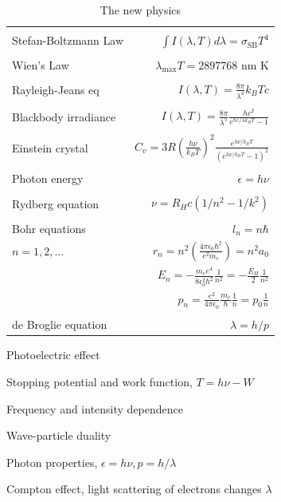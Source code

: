 \documentclass[11pt]{article}
\begin{document}
\begin{outline}
\begin{outline}
\begin{table} 
\begin{center}
    \caption{The new physics}
    \begin{tabular}{|lr|}
     \hline
 & \\
Stefan-Boltzmann Law & $\displaystyle  \int I(\lambda,T)d\lambda = \sigma_\mathrm{SB} T^4$
\\ & \\
Wien's Law & $\displaystyle \lambda_\mathrm{max}T=2897768$ nm K \\
 & \\
Rayleigh-Jeans eq& $\displaystyle I(\lambda,T) = \frac{8\pi}{\lambda^4} k_B T c $ \\ 
& \\
Blackbody irradiance & $\displaystyle I(\lambda, T) =
\frac{8\pi}{\lambda^5}\frac{hc^2}{e^{hc/\lambda k_B T}-1}$ \\ 
& \\
Einstein crystal & $\displaystyle C_v=3R \left(\frac{h\nu}{k_BT}\right )^2\frac{e^{h\nu/k_BT}}{\left
            ( e^{h\nu/k_BT}-1 \right )^2}$ \\
& \\
Photon energy & $\displaystyle \epsilon=h\nu $ \\
& \\
Rydberg equation & $\displaystyle \nu = R_H c\left (1/n^2
        -1/k^2 \right)$ \\
& \\
Bohr equations & $\displaystyle l_n=n \hbar$ \\
$\displaystyle n=1,2, \ldots $ & $\displaystyle r_n = n^2 \left ( \frac{4 \pi
    \epsilon_0 \hbar^2}{e^2 m_e} \right ) = n^2 a_0$ \\
 & $\displaystyle E_n =-\frac{m_e e^4}{8\epsilon_0^2
   h^2}\frac{1}{n^2}=-\frac{E_H}{2}\frac{1}{n^2}$ \\ 
 & $\displaystyle p_n =\frac{e^2}{4\pi\epsilon_0}\frac{m_e}{\hbar}\frac{1}{n} =
p_0 \frac{1}{n} $ \\
& \\
de Broglie equation & $\displaystyle \lambda=h/p $ \\
\hline
\end{tabular}
\end{center}
\end{table}

  \item{Photoelectric effect}
    \begin{outline}
    \item Stopping potential and work function, $T =h\nu -W$
    \item Frequency and intensity dependence
    \item{Wave-particle duality}
    \item{Photon properties, $\epsilon = h\nu, p=h/\lambda$}
    \item Compton effect, light scattering of electrons changes $\lambda$
    \end{outline}
  

\end{outline}
\end{outline}
\end{document}
